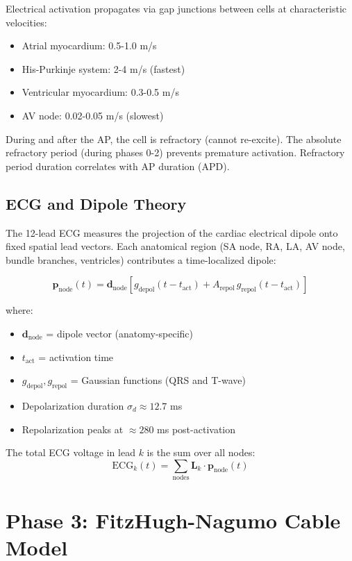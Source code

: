 \documentclass[12pt,a4paper]{article}
\begin{document}
Electrical activation propagates via gap junctions between cells at characteristic velocities:
\begin{itemize}
\item Atrial myocardium: 0.5-1.0 m/s
\item His-Purkinje system: 2-4 m/s (fastest)
\item Ventricular myocardium: 0.3-0.5 m/s
\item AV node: 0.02-0.05 m/s (slowest)
\end{itemize}

During and after the AP, the cell is refractory (cannot re-excite). The absolute refractory period (during phases 0-2) prevents premature activation. Refractory period duration correlates with AP duration (APD).

\subsection*{ECG and Dipole Theory}

The 12-lead ECG measures the projection of the cardiac electrical dipole onto fixed spatial lead vectors. Each anatomical region (SA node, RA, LA, AV node, bundle branches, ventricles) contributes a time-localized dipole:

$$\mathbf{p}_{\text{node}}(t) = \mathbf{d}_{\text{node}} \left[ g_{\text{depol}}(t-t_{\text{act}}) + A_{\text{repol}} \, g_{\text{repol}}(t-t_{\text{act}}) \right]$$

where:
\begin{itemize}
\item $\mathbf{d}_{\text{node}}$ = dipole vector (anatomy-specific)
\item $t_{\text{act}}$ = activation time
\item $g_{\text{depol}}, g_{\text{repol}}$ = Gaussian functions (QRS and T-wave)
\item Depolarization duration $\sigma_d \approx 12.7$ ms
\item Repolarization peaks at $\approx 280$ ms post-activation
\end{itemize}

The total ECG voltage in lead $k$ is the sum over all nodes:
$$\text{ECG}_k(t) = \sum_{\text{nodes}} \mathbf{L}_k \cdot \mathbf{p}_{\text{node}}(t)$$

\section*{Phase 3: FitzHugh-Nagumo Cable Model}
\end{document}
